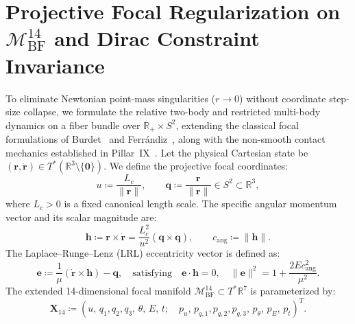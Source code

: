 \documentclass[11pt,a4paper,reqno]{article}
\theoremstyle{plain}
\theoremstyle{definition}
\theoremstyle{remark}
\numberwithin{equation}{section}
\newcommand{\R}{\mathbb{R}}
\begin{document}
\section{Projective Focal Regularization on \texorpdfstring{$\mathcal{M}_{\mathrm{BF}}^{14}$}{M BF 14} and Dirac Constraint Invariance}
\label{sec:focal_regularization}

To eliminate Newtonian point-mass singularities ($r \to 0$) without coordinate step-size collapse, we formulate the relative two-body and restricted multi-body dynamics on a fiber bundle over $\R_+ \times S^2$, extending the classical focal formulations of Burdet~\cite{burdet1969} and Ferr\'{a}ndiz~\cite{ferrandiz1988}, along with the non-smooth contact mechanics established in Pillar~IX~\cite{PillarIXPreprint}. Let the physical Cartesian state be $(\bm{r}, \dot{\bm{r}}) \in T^*(\R^3 \setminus \{\bm{0}\})$. We define the projective focal coordinates:
\begin{equation}
  u \coloneqq \frac{L_c}{\|\bm{r}\|}, \qquad \bm{q} \coloneqq \frac{\bm{r}}{\|\bm{r}\|} \in S^2 \subset \R^3,
  \label{eq:focal_coords}
\end{equation}
where $L_c > 0$ is a fixed canonical length scale. The specific angular momentum vector and its scalar magnitude are:
\begin{equation}
  \bm{h} \coloneqq \bm{r} \times \dot{\bm{r}} = \frac{L_c^2}{u^2} (\bm{q} \times \dot{\bm{q}}), \qquad c_{\mathrm{ang}} \coloneqq \|\bm{h}\|.
\end{equation}
The Laplace--Runge--Lenz (LRL) eccentricity vector is defined as:
\begin{equation}
  \bm{e} \coloneqq \frac{1}{\mu} (\dot{\bm{r}} \times \bm{h}) - \bm{q}, \quad \text{satisfying} \quad \bm{e} \cdot \bm{h} = 0, \quad \|\bm{e}\|^2 = 1 + \frac{2 E c_{\mathrm{ang}}^2}{\mu^2}.
\end{equation}
The extended 14-dimensional focal manifold $\mathcal{M}_{\mathrm{BF}}^{14} \subset T^*\R^7$ is parameterized by:
\begin{equation}
  \bm{X}_{14} \coloneqq \left( u, \, q_1, q_2, q_3, \, \theta, \, E, \, t; \quad p_u, \, p_{q,1}, p_{q,2}, p_{q,3}, \, p_\theta, \, p_E, \, p_t \right)^T.
\end{equation}
\end{document}
